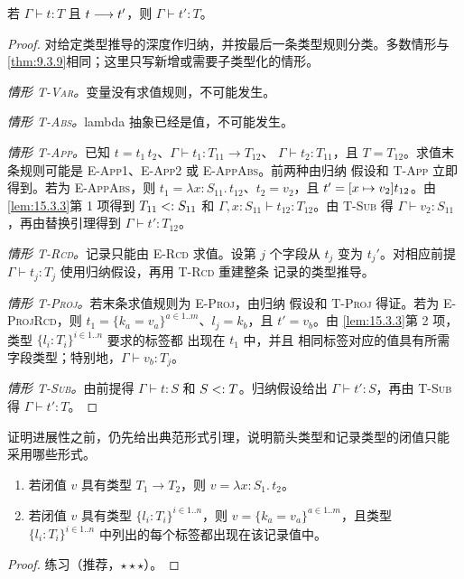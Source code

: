 \begin{theorem}[保持性]
\label{thm:15.3.5}
若 \(\Gamma\vdash t:T\) 且 \(t\mathrel{\longrightarrow} t'\)，则
\(\Gamma\vdash t':T\)。
\end{theorem}
\begin{proof}
对给定类型推导的深度作归纳，并按最后一条类型规则分类。多数情形与
\cref{thm:9.3.9}相同；这里只写新增或需要子类型化的情形。

\emph{情形 \textsc{T-Var}。}变量没有求值规则，不可能发生。

\emph{情形 \textsc{T-Abs}。}lambda 抽象已经是值，不可能发生。

\emph{情形 \textsc{T-App}。}已知
\(t=t_1\,t_2\)、\(\Gamma\vdash t_1:T_{11}\to T_{12}\)、
\(\Gamma\vdash t_2:T_{11}\)，且 \(T=T_{12}\)。求值末条规则可能是
\textsc{E-App1}、\textsc{E-App2} 或 \textsc{E-AppAbs}。前两种由归纳
假设和 \textsc{T-App} 立即得到。若为 \textsc{E-AppAbs}，则
\(t_1=\lambda x:S_{11}.\,t_{12}\)、\(t_2=v_2\)，且
\(t'=[x\mapsto v_2]t_{12}\)。由\cref{lem:15.3.3}第 1 项得到
\(T_{11}\mathrel{<:} S_{11}\) 和
\(\Gamma,x:S_{11}\vdash t_{12}:T_{12}\)。由 \textsc{T-Sub} 得
\(\Gamma\vdash v_2:S_{11}\)，再由替换引理得到
\(\Gamma\vdash t':T_{12}\)。

\emph{情形 \textsc{T-Rcd}。}记录只能由 \textsc{E-Rcd} 求值。设第
\(j\) 个字段从 \(t_j\) 变为 \(t_j'\)。对相应前提
\(\Gamma\vdash t_j:T_j\) 使用归纳假设，再用 \textsc{T-Rcd} 重建整条
记录的类型推导。

\emph{情形 \textsc{T-Proj}。}若末条求值规则为 \textsc{E-Proj}，由归纳
假设和 \textsc{T-Proj} 得证。若为 \textsc{E-ProjRcd}，则
\(t_1=\{k_a=v_a\}^{a\in1..m}\)、\(l_j=k_b\)，且 \(t'=v_b\)。由
\cref{lem:15.3.3}第 2 项，类型 \(\{l_i:T_i\}^{i\in1..n}\) 要求的标签都
出现在 \(t_1\) 中，并且
相同标签对应的值具有所需字段类型；特别地，\(\Gamma\vdash v_b:T_j\)。

\emph{情形 \textsc{T-Sub}。}由前提得
\(\Gamma\vdash t:S\) 和 \(S\mathrel{<:} T\)。归纳假设给出
\(\Gamma\vdash t':S\)，再由 \textsc{T-Sub} 得
\(\Gamma\vdash t':T\)。
\end{proof}

证明进展性之前，仍先给出典范形式引理，说明箭头类型和记录类型的闭值只能
采用哪些形式。

\taplstatementliststart
\begin{lemma}[典范形式]
\label{lem:15.3.6}
\taplstatementlistbreak
\begin{enumerate}
\item 若闭值 \(v\) 具有类型 \(T_1\to T_2\)，则
  \(v=\lambda x:S_1.\,t_2\)。
\item 若闭值 \(v\) 具有类型 \(\{l_i:T_i\}^{i\in1..n}\)，则
  \(v=\{k_a=v_a\}^{a\in1..m}\)，且类型
  \(\{l_i:T_i\}^{i\in1..n}\) 中列出的每个标签都出现在该记录值中。
\end{enumerate}
\end{lemma}
\begin{proof}
练习（推荐，\(\star\star\star\)）。
\end{proof}

